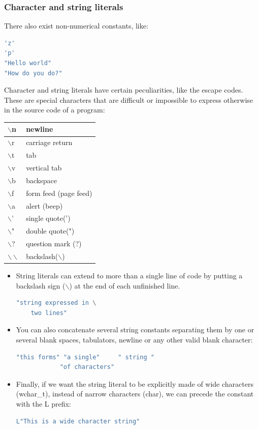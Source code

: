 \documentclass[12pt,oneside]{book}
\begin{document}
\subsubsection{Character and string literals}
There also exist non-numerical constants, like:
\begin{lstlisting}[language=C++]
'z'
'p'
"Hello world"
"How do you do?"
\end{lstlisting}
Character and string literals have certain peculiarities, like the escape codes.\\ These are special characters that are difficult or impossible to express otherwise in the source code of a program:
\begin{center}
	\begin{tabular}{|l|l|}
		\hline
		$\backslash$n          & newline                 \\ \hline
		$\backslash$r          & carriage return         \\ \hline
		$\backslash$t          & tab                     \\ \hline
		$\backslash$v          & vertical tab            \\ \hline
		$\backslash$b          & backspace               \\ \hline
		$\backslash$f          & form feed (page feed)   \\ \hline
		$\backslash$a          & alert (beep)            \\ \hline
		$\backslash$'          & single quote(')         \\ \hline
		$\backslash$"          & double quote(")         \\ \hline
		$\backslash$?          & question mark (?)       \\ \hline
		$\backslash\backslash$ & backslash($\backslash$) \\ \hline
	\end{tabular}
\end{center}
\begin{itemize}
	\item String literals can extend to more than a single line of code by putting a backslash sign ($\backslash$) at the end of each unfinished line.
		      \begin{lstlisting}[language=C++]
        "string expressed in \
    two lines" 
    \end{lstlisting}
	\item You can also concatenate several string constants separating them by one or several blank spaces, tabulators, newline or any other valid blank character:
	      \begin{lstlisting}[language=C++]
            "this forms" "a single"     " string "
            "of characters"
    \end{lstlisting}
	\item Finally, if we want the string literal to be explicitly made of wide characters (wchar\_t), instead of narrow characters
	      (char), we can precede the constant with the L prefix:
	      \begin{lstlisting}[language=C++]
        L"This is a wide character string"
    \end{lstlisting}
\end{itemize}
\end{document}
